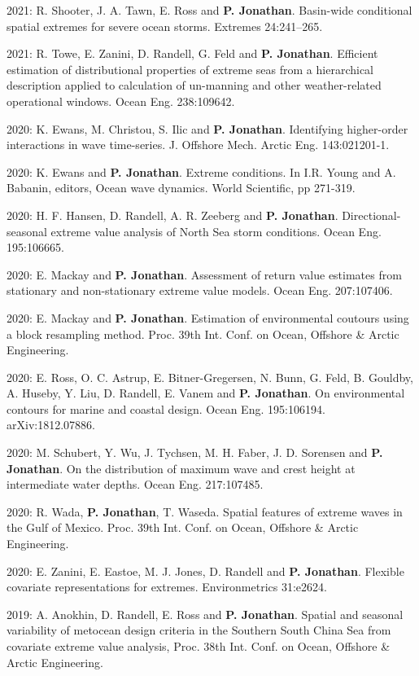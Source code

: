 \documentclass[11pt,a4paper]{moderncv}
\begin{document}
2021: R. Shooter, J. A. Tawn, E. Ross  and \textbf{P. Jonathan}. Basin-wide conditional spatial extremes for severe ocean storms. Extremes 24:241--265.

2021: R. Towe, E. Zanini, D. Randell, G. Feld and \textbf{P. Jonathan}. Efficient estimation of distributional properties of extreme seas from a hierarchical description applied to calculation of un-manning and other weather-related operational windows. Ocean Eng. 238:109642.

2020: K. Ewans, M. Christou, S. Ilic and \textbf{P. Jonathan}. Identifying higher-order interactions in wave time-series. J. Offshore Mech. Arctic Eng. 143:021201-1.

2020: K. Ewans and \textbf{P. Jonathan}. Extreme conditions. In I.R. Young and A. Babanin, editors, Ocean wave dynamics. World Scientific, pp 271-319.

2020: H. F. Hansen, D. Randell, A. R. Zeeberg and \textbf{P. Jonathan}. Directional-seasonal extreme value analysis of North Sea storm conditions. Ocean Eng. 195:106665. 

2020: E. Mackay and \textbf{P. Jonathan}. Assessment of return value estimates from stationary and non-stationary extreme value models. Ocean Eng. 207:107406.

2020: E. Mackay and \textbf{P. Jonathan}. Estimation of environmental coutours using a block resampling method. Proc. 39th Int. Conf. on Ocean, Offshore \& Arctic Engineering.

2020: E. Ross, O. C. Astrup, E. Bitner-Gregersen, N. Bunn, G. Feld, B. Gouldby, A. Huseby, Y. Liu,  D. Randell, E. Vanem and \textbf{P. Jonathan}. On environmental contours for marine and coastal design. Ocean Eng. 195:106194. arXiv:1812.07886.

2020: M. Schubert, Y. Wu,  J. Tychsen, M. H. Faber, J. D. Sorensen and \textbf{P. Jonathan}. On the distribution of maximum wave and crest height at intermediate water depths. Ocean Eng. 217:107485.

2020: R. Wada, \textbf{P. Jonathan}, T. Waseda. Spatial features of extreme waves in the Gulf of Mexico. Proc. 39th Int. Conf. on Ocean, Offshore \& Arctic Engineering.

2020: E. Zanini, E. Eastoe, M. J. Jones, D. Randell and \textbf{P. Jonathan}. Flexible covariate representations for extremes. Environmetrics 31:e2624.

2019: A. Anokhin, D. Randell, E. Ross and \textbf{P. Jonathan}. Spatial and seasonal variability of metocean design criteria in the Southern South China Sea from covariate extreme value analysis, Proc. 38th Int. Conf. on Ocean, Offshore \& Arctic Engineering.
\end{document}
